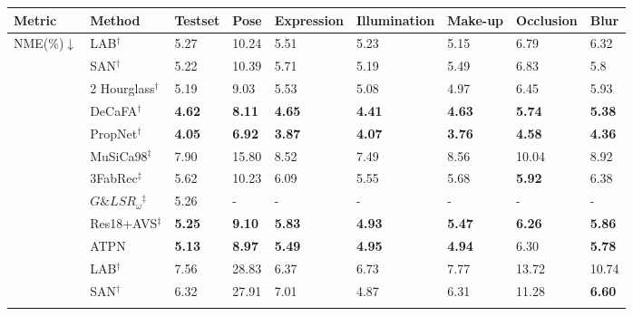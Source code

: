 \documentclass[3p,twocolumn, round, sort & compress]{elsarticle}
\begin{document}
\begin{table*}[t!]
	\centering
	\begin{tabular}{m{1.4cm}<{\centering}|m{3.8cm}<{\centering}|m{0.8cm}<{\centering}|m{0.7cm}<{\centering}|m{1.4cm}<{\centering}|m{1.5cm}<{\centering}|m{1.3cm}<{\centering}|m{1.2cm}<{\centering}|m{0.7cm}<{\centering}}
		\hline
		Metric & Method & Testset & Pose  & Expression & Illumination & Make-up & Occlusion & Blur \\ \hline
		\multirow{18}{*}{NME(\%)$\downarrow$} 
		& LAB$^\dag$ \citep{LAB} & 5.27 & 10.24 & 5.51 & 5.23 & 5.15 & 6.79  & 6.32  \\
		& SAN$^\dag$ \citep{SAN} & 5.22 & 10.39 & 5.71 & 5.19 & 5.49 & 6.83 & 5.8  \\
		& 2 Hourglass$^\dag$ \citep{Hourglass} & 5.19 & 9.03 & 5.53 & 5.08 & 4.97 & 6.45 & 5.93 \\
		& DeCaFA$^\dag$ \citep{DeCaFA} & {\color{blue} \textbf{4.62}} & {\color{blue} \textbf{8.11}} & {\color{blue} \textbf{4.65}} & {\color{blue} \textbf{4.41}} & {\color{blue} \textbf{4.63}} & {\color{blue} \textbf{5.74}} & {\color{blue} \textbf{5.38}}  \\
		& PropNet$^\dag$ \citep{PropNet}  & {\color{red} \textbf{4.05}} & {\color{red} \textbf{6.92}} & {\color{red} \textbf{3.87}} & {\color{red} \textbf{4.07}} & {\color{red} \textbf{3.76}} & {\color{red} \textbf{4.58}} & {\color{red} \textbf{4.36}} \\ \cline{2-9}
		& MuSiCa98$^\ddag$ \citep{KWTQ} & 7.90 & 15.80 & 8.52 & 7.49 & 8.56 & 10.04 & 8.92 \\
		& 3FabRec$^\ddag$ \citep{3FabRec} & 5.62 & 10.23 & 6.09 & 5.55 & 5.68 & {\color{red} \textbf{5.92}} & 6.38 \\
		& $G\&LSR_\omega$$^\ddag$\citep{RFA} & 5.26 & - & - & - & - & - & -\\
		& Res18+AVS$^\ddag$ \citep{AVS} & {\color{blue} \textbf{5.25}} & {\color{blue} \textbf{9.10}} & {\color{blue} \textbf{5.83}} & {\color{red} \textbf{4.93}} & {\color{blue} \textbf{5.47}} & {\color{blue} \textbf{6.26}} & {\color{blue} \textbf{5.86}} \\
		& ATPN & {\color{red} \textbf{5.13}} & {\color{red} \textbf{8.97}} & {\color{red} \textbf{5.49}} & {\color{blue} \textbf{4.95}} & {\color{red} \textbf{4.94}} & 6.30 & {\color{red} \textbf{5.78}} \\ \hline
		\multirow{10}{*}{FR$_{0.1}$(\%)$\downarrow$} 
		& LAB$^\dag$ & 7.56 & 28.83 & 6.37 & 6.73 & 7.77 & 13.72 & 10.74 \\
		& SAN$^\dag$ & 6.32 & 27.91 & 7.01 & 4.87 & 6.31 & 11.28 & {\color{blue} \textbf{6.60}}   \\
$$
\end{tabular}
\end{table*}
\end{document}
